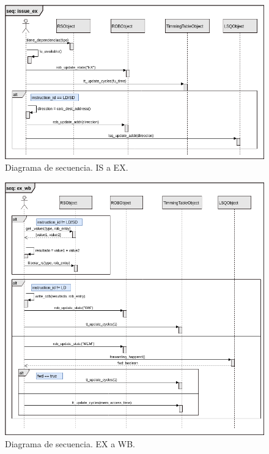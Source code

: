 \documentclass[a4paper]{article}
\begin{document}
	\begin{figure}[H]
		\centering
		\includegraphics[width=1\textwidth]{figures/issue_ex.png}
		\caption{\label{fig:issue_ex}Diagrama de secuencia. IS a EX.}
	\end{figure}

	\begin{figure}[H]
		\centering
		\includegraphics[width=1\textwidth]{figures/ex_wb.png}
		\caption{\label{fig:ex_wb}Diagrama de secuencia. EX a WB.}
	\end{figure}
\end{document}

